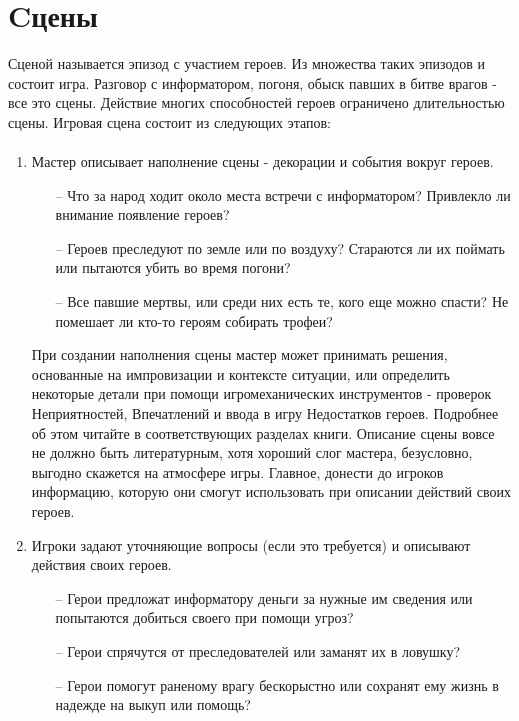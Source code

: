 \section{Cцены}
Сценой называется эпизод с участием героев. Из множества таких эпизодов и состоит игра. Разговор с информатором, погоня, обыск павших в битве врагов - все это сцены. Действие многих способностей героев ограничено длительностью сцены.
Игровая сцена состоит из следующих этапов:
\paragraph{}
\begin{enumerate}

 \item Мастер описывает наполнение сцены - декорации и события вокруг героев.
\begin{itemize}
\item[--] Что за народ ходит около места встречи с информатором? Привлекло ли внимание появление героев?
\item[--] Героев преследуют по земле или по воздуху? Стараются ли их поймать или пытаются убить во время погони?
\item[--] Все павшие мертвы, или среди них есть те, кого еще можно спасти? Не помешает ли кто-то героям собирать трофеи?
\end{itemize}
При создании наполнения сцены мастер может принимать решения, основанные на импровизации и контексте ситуации, или определить некоторые детали при помощи игромеханических инструментов - проверок Неприятностей, Впечатлений и ввода в игру Недостатков героев. Подробнее об этом читайте в соответствующих разделах книги.
\linebreak
Описание сцены вовсе не должно быть литературным, хотя хороший слог мастера, безусловно, выгодно скажется на атмосфере игры. Главное, донести до игроков информацию, которую они смогут использовать при описании действий своих героев.
 \item Игроки задают уточняющие вопросы (если это требуется) и описывают действия своих героев.
\begin{itemize}
\item[--] Герои предложат информатору деньги за нужные им сведения или попытаются добиться своего при помощи угроз?
\item[--] Герои спрячутся от преследователей или заманят их в ловушку?
\item[--] Герои помогут раненому врагу бескорыстно или сохранят ему жизнь в надежде на выкуп или помощь?

\end{itemize}
\end{enumerate}
